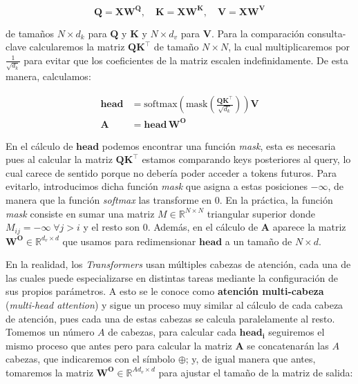 \documentclass[12pt,twoside]{article}
\begin{document}
\begin{equation}
    \mathbf{Q}=\mathbf{XW^Q},\quad \mathbf{K}=\mathbf{XW^K}, \quad \mathbf{V}=\mathbf{XW^V}
\end{equation}

de tamaños $N\times d_k$ para $\mathbf{Q}$ y $\mathbf{K}$ y $N\times d_v$ para $\mathbf{V}$. Para la comparación consulta-clave calcularemos la matriz $\mathbf{QK}^\top$ de tamaño $N\times N$, la cual multiplicaremos por $\frac{1}{\sqrt{d_k}}$ para evitar que los coeficientes de la matriz escalen indefinidamente. De esta manera, calculamos:

\begin{align}
\textbf{head} &= \text{softmax} \left( \text{mask} \left( \frac{\mathbf{QK}^\top}{\sqrt{d_k}} \right) \right) \mathbf{V} \\
\mathbf{A} &= \textbf{head} \, \mathbf{W^O}
\end{align}

En el cálculo de $\mathbf{head}$ podemos encontrar una función \textit{mask}, esta es necesaria pues al calcular la matriz $\mathbf{QK}^\top$ estamos comparando keys posteriores al query, lo cual carece de sentido porque no debería poder acceder a tokens futuros. Para evitarlo, introducimos dicha función \textit{mask} que asigna a estas posiciones $-\infty$, de manera que la función \textit{softmax} las transforme en $0$. En la práctica, la función \textit{mask} consiste en sumar una matriz $M\in\mathbb{R}^{N\times N}$ triangular superior donde $M_{ij}=-\infty\;\forall j>i$ y el resto son $0$. Además, en el cálculo de $\mathbf{A}$ aparece la matriz $\mathbf{W^O}\in\mathbb{R}^{d_v\times d}$ que usamos para redimensionar $\mathbf{head}$ a un tamaño de $N\times d$.

En la realidad, los \textit{Transformers} usan múltiples cabezas de atención, cada una de las cuales puede especializarse en distintas tareas mediante la configuración de sus propios parámetros. A esto se le conoce como \textbf{atención multi-cabeza} (\textit{multi-head attention}) y sigue un proceso muy similar al cálculo de cada cabeza de atención, pues cada una de estas cabezas se calcula paralelamente al resto. Tomemos un número $A$ de cabezas, para calcular cada $\mathbf{head_i}$ seguiremos el mismo proceso que antes pero para calcular la matriz $\mathbf{A}$ se concatenarán las $A$ cabezas, que indicaremos con el símbolo $\oplus$; y, de igual manera que antes, tomaremos la matriz $\mathbf{W^O}\in\mathbb{R}^{Ad_v\times d}$ para ajustar el tamaño de la matriz de salida:
\end{document}
